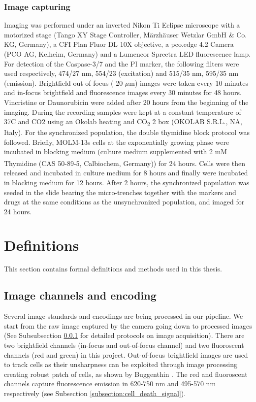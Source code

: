 \documentclass[pdftex,12pt,a4paper]{report}
\begin{document}
\subsubsection{Image capturing}
\label{subsubsection:image_capturing}

Imaging was performed under an inverted Nikon Ti Eclipse microscope with a motorized stage (Tango XY Stage Controller, M\"arzh\"auser Wetzlar GmbH \& Co. KG, Germany), a CFI Plan Fluor DL 10X objective, a pco.edge 4.2 Camera (PCO AG, Kelheim, Germany) and a Lumencor Sprectra LED fluorescence lamp. For detection of the Caspase-3/7 and the PI marker, the following filters were used respectively, 474/27 nm, 554/23 (excitation) and 515/35 nm, 595/35 nm (emission). Brightfield out of focus (-20 $\mu$m) images were taken every 10 minutes and in-focus  brightfield and fluorescence images every 30 minutes for 48 hours. Vincristine or Daunorubicin were added after 20 hours from the beginning of the imaging. During the recording samples were kept at a constant temperature of 37\degree C and CO2 using an Okolab heating and CO\textsubscript{2} 2 box (OKOLAB S.R.L., NA, Italy). For the synchronized population, the double thymidine block protocol was followed. Briefly, MOLM-13s cells at the exponentially growing phase were incubated in blocking medium (culture medium supplemented with 2 mM Thymidine (CAS 50-89-5, Calbiochem\textsuperscript{\textregistered}, Germany)) for 24 hours. Cells were then released and incubated in culture medium for 8 hours and finally were incubated in blocking medium for 12 hours. After 2 hours, the synchronized population was seeded in the slide bearing the micro-trenches together with the markers and drugs at the same conditions as the unsynchronized population, and imaged for 24 hours.


\section{Definitions}

This section contains formal definitions and methods used in this thesis.

\subsection{Image channels and encoding}
\label{subsection:image_encoding}

Several image standards and encodings are being processed in our pipeline. We start from the raw image captured by the camera going down to processed images (See Subsubsection \ref{subsubsection:image_capturing} for detailed protocols on image acquisition). There are two brightfield channels (in-focus and out-of-focus channel) and two fluoroscent channels (red and green) in this project. Out-of-focus brightfield images are used to track cells as their unsharpness can be exploited through image processing creating robust patch of cells, as shown by Buggenthin \cite{buggenthin2011computational}. The red and fluoroscent channels capture fluorescence emission in 620-750 nm and 495-570 nm respectively (see Subsection \ref{subsection:cell_death_signal}).
\end{document}
